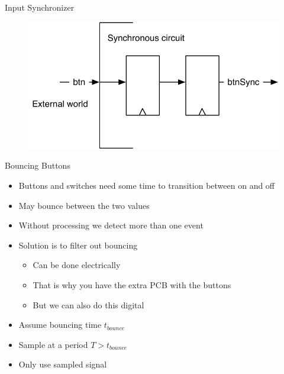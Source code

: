 \begin{frame}[fragile]{Input Synchronizer}
\begin{figure}
  \includegraphics[scale=\scale]{../figures/synchronizer}
\end{figure}
\end{frame}

\begin{frame}[fragile]{Bouncing Buttons}
\begin{itemize}
\item Buttons and switches need some time to transition between on and off
\item May bounce between the two values
\item Without processing we detect more than one event
\item Solution is to filter out bouncing
\begin{itemize}
\item Can be done electrically
\item That is why you have the extra PCB with the buttons
\item But we can also do this digital
\end{itemize}
\item Assume  bouncing time $t_{bounce}$
\item Sample at a period $T > t_{bounce}$
\item Only use sampled signal
\end{itemize}
\end{frame}


